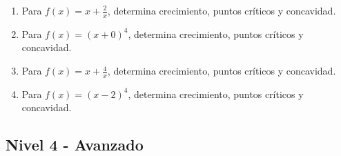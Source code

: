 \documentclass[11pt,a4paper]{article}
\begin{document}
\begin{enumerate}[label=\textbf{E\arabic*.},start=141]
\item Para $f(x)=x+\frac{2}{x}$, determina crecimiento, puntos críticos y concavidad.

\item Para $f(x)=(x+0)^4$, determina crecimiento, puntos críticos y concavidad.

\item Para $f(x)=x+\frac{4}{x}$, determina crecimiento, puntos críticos y concavidad.

\item Para $f(x)=(x-2)^4$, determina crecimiento, puntos críticos y concavidad.

\end{enumerate}

\subsection{Nivel 4 - Avanzado}
\end{document}
